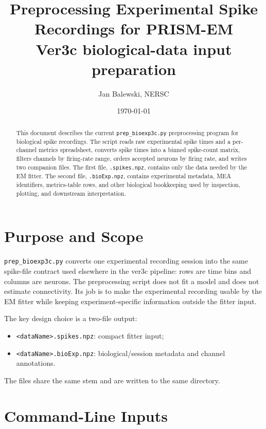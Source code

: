 \documentclass[11pt]{article}
\title{Preprocessing Experimental Spike Recordings for PRISM-EM\\
\large Ver3c biological-data input preparation}
\author{Jan Balewski, NERSC}
\date{\today}
\begin{document}
\maketitle

\begin{abstract}
This document describes the current \texttt{prep\_bioexp3c.py}
preprocessing program for biological spike recordings. The script reads
raw experimental spike times and a per-channel metrics spreadsheet,
converts spike times into a binned spike-count matrix, filters channels by
firing-rate range, orders accepted neurons by firing rate, and writes two
companion files. The first file, \texttt{.spikes.npz}, contains only the
data needed by the EM fitter. The second file, \texttt{.bioExp.npz},
contains experimental metadata, MEA identifiers, metrics-table rows, and
other biological bookkeeping used by inspection, plotting, and downstream
interpretation.
\end{abstract}

\tableofcontents
\newpage

\section{Purpose and Scope}
\label{sec:scope}

\texttt{prep\_bioexp3c.py} converts one experimental recording session into
the same spike-file contract used elsewhere in the ver3c pipeline:
rows are time bins and columns are neurons. The preprocessing script does
not fit a model and does not estimate connectivity. Its job is to make the
experimental recording usable by the EM fitter while keeping
experiment-specific information outside the fitter input.

The key design choice is a two-file output:
\begin{itemize}
  \item \texttt{<dataName>.spikes.npz}: compact fitter input;
  \item \texttt{<dataName>.bioExp.npz}: biological/session metadata and
        channel annotations.
\end{itemize}
The files share the same stem and are written to the same directory.

\section{Command-Line Inputs}
\label{sec:cli}
\end{document}
